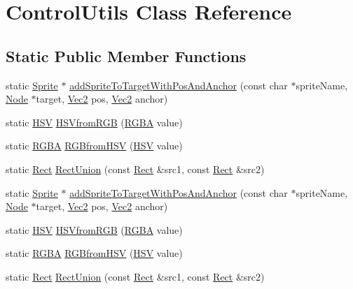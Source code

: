 \hypertarget{classControlUtils}{}\section{Control\+Utils Class Reference}
\label{classControlUtils}
\subsection*{Static Public Member Functions}
\begin{DoxyCompactItemize}
\item 
static \hyperlink{classSprite}{Sprite} $\ast$ \hyperlink{classControlUtils_a67096e2a8d8f29be1a213dbe1039e59c}{add\+Sprite\+To\+Target\+With\+Pos\+And\+Anchor} (const char $\ast$sprite\+Name, \hyperlink{classNode}{Node} $\ast$target, \hyperlink{classVec2}{Vec2} pos, \hyperlink{classVec2}{Vec2} anchor)
\item 
static \hyperlink{structHSV}{H\+SV} \hyperlink{classControlUtils_a4768aeeefc97af0e2afabac90bc92ee5}{H\+S\+Vfrom\+R\+GB} (\hyperlink{structRGBA}{R\+G\+BA} value)
\item 
static \hyperlink{structRGBA}{R\+G\+BA} \hyperlink{classControlUtils_a9e4144faea346e5e563fb7a2116ac69b}{R\+G\+Bfrom\+H\+SV} (\hyperlink{structHSV}{H\+SV} value)
\item 
static \hyperlink{classRect}{Rect} \hyperlink{classControlUtils_af036ce9e54220e5cb5cef86263aac02e}{Rect\+Union} (const \hyperlink{classRect}{Rect} \&src1, const \hyperlink{classRect}{Rect} \&src2)
\item 
static \hyperlink{classSprite}{Sprite} $\ast$ \hyperlink{classControlUtils_ad4d2b902f91e44d9d27c7e216cf93323}{add\+Sprite\+To\+Target\+With\+Pos\+And\+Anchor} (const char $\ast$sprite\+Name, \hyperlink{classNode}{Node} $\ast$target, \hyperlink{classVec2}{Vec2} pos, \hyperlink{classVec2}{Vec2} anchor)
\item 
static \hyperlink{structHSV}{H\+SV} \hyperlink{classControlUtils_a4b04cec4678408746b3c81b8e1fa8afe}{H\+S\+Vfrom\+R\+GB} (\hyperlink{structRGBA}{R\+G\+BA} value)
\item 
static \hyperlink{structRGBA}{R\+G\+BA} \hyperlink{classControlUtils_a3ac328998242b244102f7904203d795e}{R\+G\+Bfrom\+H\+SV} (\hyperlink{structHSV}{H\+SV} value)
\item 
static \hyperlink{classRect}{Rect} \hyperlink{classControlUtils_a29002cf54d0420fd910c30b72f5de74e}{Rect\+Union} (const \hyperlink{classRect}{Rect} \&src1, const \hyperlink{classRect}{Rect} \&src2)
\end{DoxyCompactItemize}


